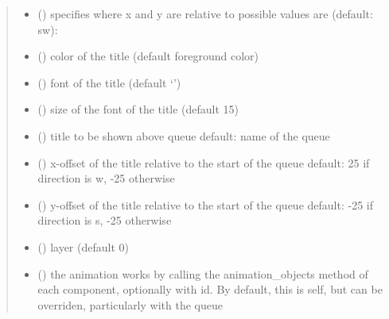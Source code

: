 \documentclass[letterpaper,10pt,english]{sphinxmanual}
\begin{document}
\begin{fulllineitems}
\begin{quote}
\begin{description}
\begin{itemize}
\item {} 
 () \textendash{} specifies where x and y are relative to 
possible values are (default: sw): 

\item {} 
 () \textendash{} color of the title (default foreground color)

\item {} 
 () \textendash{} font of the title (default ‘’)

\item {} 
 () \textendash{} size of the font of the title (default 15)

\item {} 
 () \textendash{} title to be shown above queue 
default: name of the queue

\item {} 
 () \textendash{} x-offset of the title relative to the start of the queue 
default: 25 if direction is w, -25 otherwise

\item {} 
 () \textendash{} y-offset of the title relative to the start of the queue 
default: -25 if direction is s, -25 otherwise

\item {} 
 () \textendash{} layer (default 0)

\item {} 
 () \textendash{} the animation works by calling the animation\_objects method of each component, optionally
with id. By default, this is self, but can be overriden, particularly with the queue


\end{itemize}
\end{description}
\end{quote}
\end{fulllineitems}
\end{document}
